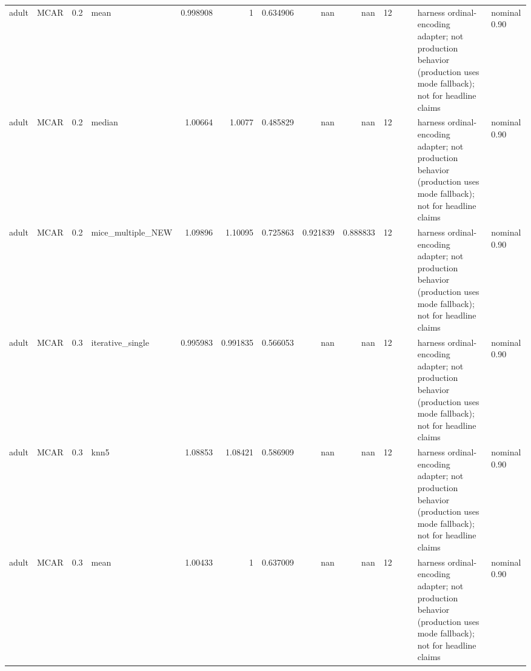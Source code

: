 \begin{table}[ht]
\begin{tabular}{llrlrrrrrrllll}
 adult                & MCAR        &         0.2 & mean              &       0.998908 &             1        &                 0.634906 &                     nan        &                       nan        &        12 &                    &                                         & harness ordinal-encoding adapter; not production behavior (production uses mode fallback); not for headline claims & nominal 0.90              \\
 adult                & MCAR        &         0.2 & median            &       1.00664  &             1.0077   &                 0.485829 &                     nan        &                       nan        &        12 &                    &                                         & harness ordinal-encoding adapter; not production behavior (production uses mode fallback); not for headline claims & nominal 0.90              \\
 adult                & MCAR        &         0.2 & mice\_multiple\_NEW &       1.09896  &             1.10095  &                 0.725863 &                       0.921839 &                         0.888833 &        12 &                    &                                         & harness ordinal-encoding adapter; not production behavior (production uses mode fallback); not for headline claims & nominal 0.90              \\
 adult                & MCAR        &         0.3 & iterative\_single  &       0.995983 &             0.991835 &                 0.566053 &                     nan        &                       nan        &        12 &                    &                                         & harness ordinal-encoding adapter; not production behavior (production uses mode fallback); not for headline claims & nominal 0.90              \\
 adult                & MCAR        &         0.3 & knn5              &       1.08853  &             1.08421  &                 0.586909 &                     nan        &                       nan        &        12 &                    &                                         & harness ordinal-encoding adapter; not production behavior (production uses mode fallback); not for headline claims & nominal 0.90              \\
 adult                & MCAR        &         0.3 & mean              &       1.00433  &             1        &                 0.637009 &                     nan        &                       nan        &        12 &                    &                                         & harness ordinal-encoding adapter; not production behavior (production uses mode fallback); not for headline claims & nominal 0.90              \\

\end{tabular}
\end{table}

